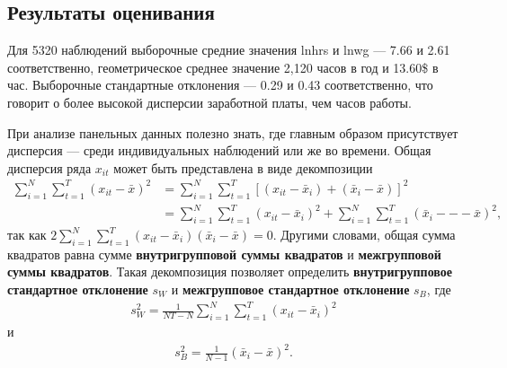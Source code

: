 \subsection{Результаты оценивания}
Для 5320 наблюдений выборочные средние значения lnhrs и lnwg --- 7.66 и 2.61 соответственно, геометрическое среднее значение 2,120 часов в год и 13.60\$  в час. Выборочные стандартные отклонения  --- 0.29 и 0.43 соответственно, что говорит о более высокой дисперсии заработной платы, чем часов работы.

При анализе панельных данных полезно знать, где главным образом присутствует дисперсия --- среди индивидуальных наблюдений или же во времени. Общая дисперсия ряда $x_{it}$ может быть представлена в виде декомпозиции
\begin{align}
\sum_{i=1}^N \sum_{t=1}^T (x_{it}-\bar x)^2
& =\sum_{i=1}^N \sum_{t=1}^T [(x_{it}-\bar x_i)+(\bar x_i-\bar x)]^2 \nonumber \\
& =\sum_{i=1}^N \sum_{t=1}^T(x_{it}-\bar x_i)^2+\sum_{i=1}^N \sum_{t=1}^T(\bar x_i --- \bar x)^2,
\nonumber
\end{align}
так как $2 \sum_{i=1}^N \sum_{t=1}^T (x_{it}-\bar x_i)(\bar x_i-\bar x)=0$. Другими словами, общая сумма квадратов равна сумме \textbf{внутригрупповой суммы квадратов} и \textbf{межгрупповой суммы квадратов}. Такая декомпозиция позволяет определить \textbf{внутригрупповое стандартное отклонение} $s_W$ и \textbf{межгрупповое стандартное отклонение} $s_B$, где
\begin{align}
s^2_W =\frac{1}{NT-N} \sum_{i=1}^N \sum_{t=1}^T (x_{it}-\bar x_i)^2
\nonumber
\end{align}
и
\begin{align}
s^2_B =\frac{1}{N-1} (\bar x_i-\bar x)^2.
\nonumber
\end{align}

